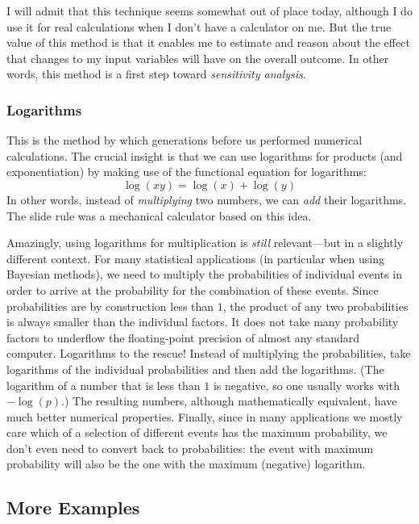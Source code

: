 I will admit that this technique seems somewhat out of place today,
although I do use it for real calculations when I don't have a
calculator on me. But the true value of this method is that it enables
me to estimate and reason about the effect that changes to my input
variables will have on the overall outcome. In other words, this
method is a first step toward \emph{sensitivity analysis}.

\subsubsection{Logarithms}

 
This is the method by which generations before us performed numerical
calculations. The crucial insight is that we can use logarithms for
products (and exponentiation) by making use of the functional equation
for logarithms:
%
\[
\log( x y ) = \log(x) + \log(y)
\]
%
In other words, instead of \emph{multiplying} two numbers, we can
\emph{add} their logarithms. The slide rule was a mechanical
calculator based on this idea.
    
Amazingly, using logarithms for multiplication is \emph{still}
relevant---but in a slightly different context. For many statistical
applications (in particular when using Bayesian methods), we need to
multiply the probabilities of individual events in order to arrive at
the probability for the combination of these events. Since
probabilities are by construction less than $1$, the product of any
two probabilities is always smaller than the individual factors. It
does not take many probability factors to underflow the floating-point
precision of almost any standard computer. Logarithms to the rescue!
Instead of multiplying the probabilities, take logarithms of the
individual probabilities and then add the logarithms.  (The logarithm
of a number that is less than $1$ is negative, so one usually works
with $-\log(p)$.)  The resulting numbers, although mathematically
equivalent, have much better numerical properties. Finally, since in
many applications we\vadjust{\pagebreak} mostly care which of a selection of different
events has the maximum probability, we don't even need to convert back
to probabilities: the event with maximum probability will also be the
one with the maximum (negative) logarithm.

\subsection{More Examples}

